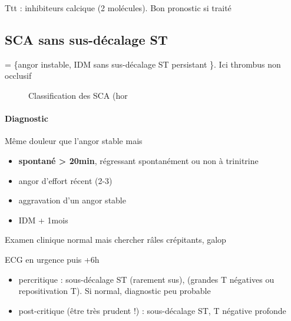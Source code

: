 \documentclass{article}
\begin{document}
Ttt : inhibiteurs calcique (2 molécules).
Bon pronostic si traité

\subsection{SCA sans sus-décalage ST}

= \{angor instable, IDM sans sus-décalage ST persistant \}. Ici thrombus non
occlusif

\begin{figure}[htpb]
  \centering
  \caption{Classification des SCA (hor}
\end{figure}

\paragraph{Diagnostic}
Même douleur que l'angor stable mais 
\begin{itemize}
  \item \textbf{spontané > 20min}, régressant spontanément ou non à trinitrine
  \item angor d'effort récent (2-3)
  \item aggravation d'un angor stable
  \item IDM + 1mois
\end{itemize}
Examen clinique normal mais chercher râles crépitants, galop

ECG en urgence \skull puis +6h
\begin{itemize}
  \item percritique : sous-décalage ST (rarement sus), (grandes T négatives ou
    repositivation T). Si normal, diagnostic peu probable
  \item post-critique (être très prudent !) : sous-décalage ST, T négative
    profonde
\end{itemize}
\end{document}
